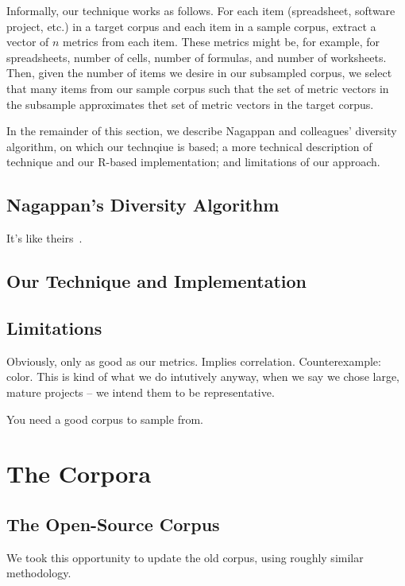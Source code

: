 \documentclass[conference]{IEEEtran}
\begin{document}

Informally, our technique works as follows.
For each item (spreadsheet, software project, etc.) in a target corpus and each
item in a sample corpus, extract a vector of $n$ metrics from each item.
These metrics might be, for example, for spreadsheets, number of cells,
number of formulas, and number of worksheets.
Then, given the number of items we desire in our subsampled corpus,
we select that many items from our sample corpus such that
the set of metric vectors in the subsample approximates thet set
of metric vectors in the target corpus.

In the remainder of this section, we describe Nagappan and colleagues'
diversity algorithm, on which our technqiue is based; 
a more technical description of technique and our R-based implementation;
and limitations of our approach.

\subsection{Nagappan's Diversity Algorithm}

It's like theirs~\cite{nagappan2013diversity}.

\subsection{Our Technique and Implementation}

\subsection{Limitations}

Obviously, only as good as our metrics. Implies correlation. Counterexample: color.
This is kind of what we do intutively anyway, when we say we chose large, mature projects -- we intend them
to be representative.

You need a good corpus to sample from.

\section{The Corpora}

\subsection{The Open-Source Corpus}

We took this opportunity to update the old corpus, using roughly similar
methodology.
\end{document}
